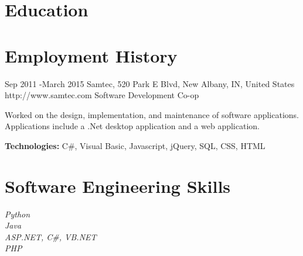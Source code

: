 \documentclass[10pt]{article} %
\begin{document}
\section{Education}





\section{Employment History}

\job
{Sep 2011 -}{March 2015}
{Samtec, 520 Park E Blvd, New Albany, IN, United States}
{http://www.samtec.com}
{Software Development Co-op}
{Worked on the design, implementation, and maintenance of software applications. Applications include a .Net desktop application and a web application. \\
\rule{0mm}{5mm}\textbf{Technologies:} C\#, Visual Basic, Javascript, jQuery, SQL, CSS, HTML}


\section{Software Engineering Skills}

{
\textit{Python}\\
\textit{Java}\\
\textit{ASP.NET, C\#, VB.NET}\\
\textit{PHP}\\
}
\end{document}
